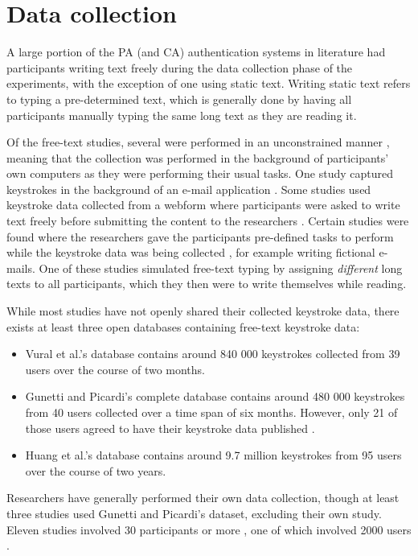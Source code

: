 \documentclass[informationsecurity]{gucmasterproject}
\begin{document}
\section{Data collection}
A large portion of the PA (and CA) authentication systems in literature had participants writing text freely during the data collection phase of the experiments, with the exception of one \cite{hu} using static text.
Writing static text refers to typing a pre-determined text, which is generally done by having all participants manually typing the same long text as they are reading it.

Of the free-text studies, several were performed in an unconstrained manner \cite{superResults, Pinto2014, Ahmed, Janakiraman2007, BOURS201236, mondal, sliding}, meaning that the collection was performed in the background of participants' own computers as they were performing their usual tasks.
One study captured keystrokes in the background of an e-mail application \cite{Messerman}.
Some studies used keystroke data collected from a webform where participants were asked to write text freely before submitting the content to the researchers \cite{gnp, davoudi2009, davoudi2010, Solami}.
Certain studies were found where the researchers gave the participants pre-defined tasks to perform while the keystroke data was being collected \cite{900words, Monrose, monaco, park, KIM2017}, for example writing fictional e-mails.
One of these studies \cite{KIM2017} simulated free-text typing by assigning \textit{different} long texts to all participants, which they then were to write themselves while reading.

While most studies have not openly shared their collected keystroke data, there exists at least three open databases containing free-text keystroke data: 
\begin{itemize}
    \item Vural et al.'s \cite{vural} database contains around 840 000 keystrokes collected from 39 users over the course of two months.
    
    \item Gunetti and Picardi's \cite{gnp} complete database contains around 480 000 keystrokes from 40 users collected over a time span of six months. However, only 21 of those users agreed to have their keystroke data published \cite{Solami}.
    
    \item Huang et al.'s \cite{sliding} database contains around 9.7 million keystrokes from 95 users over the course of two years.
\end{itemize}
Researchers have generally performed their own data collection, though at least three studies \cite{davoudi2009, davoudi2010, Solami} used Gunetti and Picardi's \cite{gnp} dataset, excluding their own study.
Eleven studies involved 30 participants or more \cite{gnp, Messerman, superResults, Ahmed, 900words, KIM2017, Monrose, sliding, mondal, monaco, park}, one of which involved 2000 users \cite{900words}.
\end{document}
